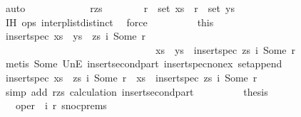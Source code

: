 \begin{isabellebody}
\ auto\isanewline
\ \ \ \ \isamarkupfalse%
\isanewline
\ \ \ \ \ \ \isamarkupfalse%
\ r{\isacharunderscore}zs\isanewline
\ \ \ \ \ \ \isamarkupfalse%
\ {\isachardoublequoteopen}r\ {\isasymnotin}\ set\ xs{\isachardoublequoteclose}\ \ {\isachardoublequoteopen}r\ {\isasymnotin}\ set\ ys{\isachardoublequoteclose}\isanewline
\ \ \ \ \ \ \ \ \isamarkupfalse%
\ IH{}\ ops{}\ interp{\isacharunderscore}list{\isacharunderscore}distinct\ \isamarkupfalse%
\ force{\isacharplus}\isanewline
\ \ \ \ \ \ \isamarkupfalse%
\ \isamarkupfalse%
\ this\ \isamarkupfalse%
\ {\isachardoublequoteopen}insert{\isacharunderscore}spec\ {\isacharparenleft}xs\ {\isacharat}\ ys\ {\isacharat}\ zs{\isacharparenright}\ {\isacharparenleft}i{}{\isacharcomma}\ Some\ r{\isacharparenright}\ {\isacharequal}\isanewline
\ \ \ \ \ \ \ \ \ \ \ \ \ \ \ \ \ \ \ \ \ \ \ \ \ \ \ \ \ \ \ xs\ {\isacharat}\ ys\ {\isacharat}\ {\isacharparenleft}insert{\isacharunderscore}spec\ zs\ {\isacharparenleft}i{}{\isacharcomma}\ Some\ r{\isacharparenright}{\isacharparenright}{\isachardoublequoteclose}\isanewline
\ \ \ \ \ \ \ \ \isamarkupfalse%
\ {\isacharparenleft}metis\ Some\ UnE\ insert{\isacharunderscore}second{\isacharunderscore}part\ insert{\isacharunderscore}spec{\isacharunderscore}nonex\ set{\isacharunderscore}append{\isacharparenright}\isanewline
\ \ \ \ \ \ \isamarkupfalse%
\ \isamarkupfalse%
\ {\isachardoublequoteopen}insert{\isacharunderscore}spec\ {\isacharparenleft}xs\ {\isacharat}\ zs{\isacharparenright}\ {\isacharparenleft}i{}{\isacharcomma}\ Some\ r{\isacharparenright}\ {\isacharequal}\ xs\ {\isacharat}\ {\isacharparenleft}insert{\isacharunderscore}spec\ zs\ {\isacharparenleft}i{}{\isacharcomma}\ Some\ r{\isacharparenright}{\isacharparenright}{\isachardoublequoteclose}\isanewline
\ \ \ \ \ \ \ \ \isamarkupfalse%
\ {\isacharparenleft}simp\ add{\isacharcolon}\ r{\isacharunderscore}zs\ calculation{\isacharparenleft}{}{\isacharparenright}\ insert{\isacharunderscore}second{\isacharunderscore}part{\isacharparenright}\isanewline
\ \ \ \ \ \ \isamarkupfalse%
\ \isamarkupfalse%
\ {\isacharquery}thesis\isanewline
\ \ \ \ \ \ \ \ \isamarkupfalse%
\ {}\ {}\ {\isacartoucheopen}oper\ {\isacharequal}\ {\isacharparenleft}i{}{\isacharcomma}\ r{}{\isacharparenright}{\isacartoucheclose}\ snoc{\isachardot}prems\ \isamarkupfalse%

\end{isabellebody}
